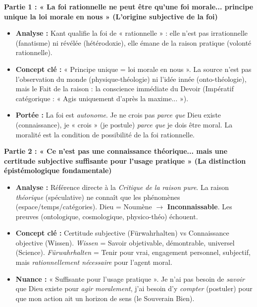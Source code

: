 \documentclass[11pt]{article}
\newcommand{\cle}[1]{{\popxbold\color{popdark}#1}}
\begin{document}
\begin{exoresolu}
\textbf{Partie 1 : « La foi rationnelle ne peut être qu'une foi morale... principe unique la loi morale en nous » (L'origine subjective de la foi)}
\begin{itemize}
    \item \textbf{Analyse :} Kant qualifie la foi de « rationnelle » : elle n'est pas irrationnelle (fanatisme) ni révélée (hétérodoxie), elle émane de la \cle{raison pratique} (volonté rationnelle).
    \item \textbf{Concept clé :} « Principe unique = loi morale en nous ». La source n'est pas l'observation du monde (physique-théologie) ni l'idée innée (onto-théologie), mais le \cle{Fait de la raison} : la conscience immédiate du \cle{Devoir} (Impératif catégorique : « Agis uniquement d'après la maxime... »).
    \item \textbf{Portée :} La foi est \emph{autonome}. Je ne crois pas \emph{parce que} Dieu existe (connaissance), je « crois » (je postule) \emph{parce que} je dois être moral. La moralité est la \cle{condition de possibilité} de la foi rationnelle.
\end{itemize}

\textbf{Partie 2 : « Ce n'est pas une connaissance théorique... mais une certitude subjective suffisante pour l'usage pratique » (La distinction épistémologique fondamentale)}
\begin{itemize}
    \item \textbf{Analyse :} Référence directe à la \emph{Critique de la raison pure}. La raison \emph{théorique} (spéculative) ne connaît que les phénomènes (espace/temps/catégories). Dieu = Noumène $\rightarrow$ \textbf{Inconnaissable}. Les preuves (ontologique, cosmologique, physico-théo) échouent.
    \item \textbf{Concept clé :} \cle{Certitude subjective (Fürwahrhalten)} vs \cle{Connaissance objective (Wissen)}. \emph{Wissen} = Savoir objetivable, démontrable, universel (Science). \emph{Fürwahrhalten} = Tenir pour vrai, engagement personnel, subjectif, mais \emph{rationnellement nécessaire} pour l'agent moral.
    \item \textbf{Nuance :} « Suffisante pour l'usage pratique ». Je n'ai pas besoin de \emph{savoir} que Dieu existe pour \emph{agir moralement}, j'ai besoin d'y \emph{compter} (postuler) pour que mon action ait un horizon de sens (le Souverain Bien).
\end{itemize}


\end{exoresolu}
\end{document}
